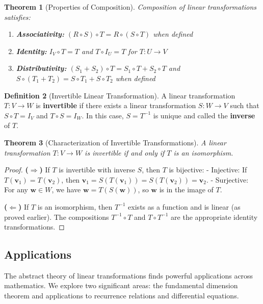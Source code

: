 \documentclass[12pt]{article}
\numberwithin{equation}{section}
\newcommand{\vect}[1]{\boldsymbol{#1}}   %
\theoremstyle{plain}
\newtheorem{theorem}{Theorem}[section]
\theoremstyle{definition}
\newtheorem{definition}[theorem]{Definition}
\theoremstyle{remark}
\begin{document}
\begin{theorem}[Properties of Composition]
Composition of linear transformations satisfies:
\begin{enumerate}
\item \textbf{Associativity:} $(R \circ S) \circ T = R \circ (S \circ T)$ when defined
\item \textbf{Identity:} $I_V \circ T = T$ and $T \circ I_U = T$ for $T: U \to V$
\item \textbf{Distributivity:} $(S_1 + S_2) \circ T = S_1 \circ T + S_2 \circ T$ and $S \circ (T_1 + T_2) = S \circ T_1 + S \circ T_2$ when defined
\end{enumerate}
\end{theorem}

\begin{definition}[Invertible Linear Transformation]
A linear transformation $T: V \to W$ is \textbf{invertible} if there exists a linear transformation $S: W \to V$ such that $S \circ T = I_V$ and $T \circ S = I_W$. In this case, $S = T^{-1}$ is unique and called the \textbf{inverse} of $T$.
\end{definition}

\begin{theorem}[Characterization of Invertible Transformations]
A linear transformation $T: V \to W$ is invertible if and only if $T$ is an isomorphism.
\end{theorem}

\begin{proof}
\textbf{($\Rightarrow$)} If $T$ is invertible with inverse $S$, then $T$ is bijective:
- Injective: If $T(\vect{v}_1) = T(\vect{v}_2)$, then $\vect{v}_1 = S(T(\vect{v}_1)) = S(T(\vect{v}_2)) = \vect{v}_2$.
- Surjective: For any $\vect{w} \in W$, we have $\vect{w} = T(S(\vect{w}))$, so $\vect{w}$ is in the image of $T$.

\textbf{($\Leftarrow$)} If $T$ is an isomorphism, then $T^{-1}$ exists as a function and is linear (as proved earlier). The compositions $T^{-1} \circ T$ and $T \circ T^{-1}$ are the appropriate identity transformations.
\end{proof}

\subsection{Applications}

The abstract theory of linear transformations finds powerful applications across mathematics. We explore two significant areas: the fundamental dimension theorem and applications to recurrence relations and differential equations.
\end{document}
